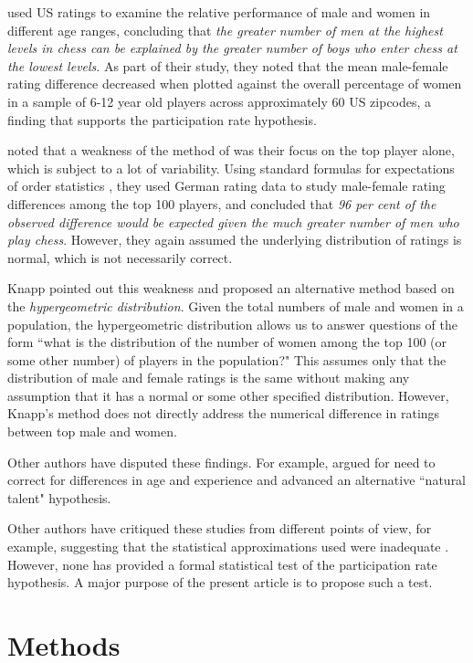 \documentclass[9pt,twocolumn,twoside,lineno]{pnas-new}
\begin{document}
\cite{chabris2006sex} used US ratings to examine the relative performance of male and women in
different age ranges, concluding that \textit{the greater number of men at the highest levels in chess
can be explained by the greater number of boys who enter chess at the lowest levels}. As part of their
study, they noted that the mean male-female rating difference decreased when plotted against the overall percentage of women in a sample of 6-12 year old players across approximately 60 US zipcodes,
a finding that supports the participation rate hypothesis.

\cite{bilalic2009best} noted that a weakness of the method of \cite{charness1996participation} was their
focus on the top player alone, which is subject to a lot of variability. Using standard formulas for
expectations of order statistics \cite{davidnagaraja}, they used German rating data to study male-female
rating differences among the top 100 players, and concluded that
\textit{96 per cent of the observed difference would be expected given the much greater number of men who play chess}. However, they again assumed the underlying distribution of ratings is normal, which is
not necessarily correct.

Knapp \cite{knapp2010prsb} pointed out this weakness and proposed an alternative method based on the \textit{hypergeometric distribution}. Given the total numbers of male and women in a population, the hypergeometric distribution allows us to answer questions of the form ``what is the distribution of the number of women among the top 100 (or some other number) of players in the population?"
This assumes only that the distribution of male and female ratings is the same without making any assumption that it has a normal or some other specified distribution. However, Knapp's method does not directly address the numerical difference in ratings between top male and women.

Other authors have disputed these findings. For example, \cite{howard2014jbs} argued for need to correct
for differences in age and experience and advanced an alternative ``natural talent" hypothesis.

Other authors have critiqued these studies from different points of view, for example, suggesting
that the statistical approximations used were inadequate \cite{wiesend}.
However, none has provided a formal statistical test of the participation rate hypothesis. A major
purpose of the present article is to propose such a test.

\section*{Methods}
\end{document}

